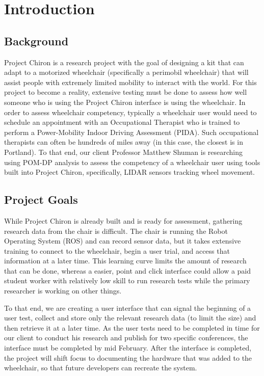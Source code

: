 \documentclass[onecolumn, draftclsnofoot,10pt, compsoc]{IEEEtran}
\begin{document}
\section{Introduction}
\subsection{Background}
Project Chiron is a research project with the goal of designing a kit that can adapt to a motorized wheelchair (specifically a perimobil wheelchair) that will assist people with extremely limited mobility to interact with the world. For this project to become a reality, extensive testing must be done to assess how well someone who is using the Project Chiron interface is using the wheelchair. In order to assess wheelchair competency, typically a wheelchair user would need to schedule an appointment with an Occupational Therapist who is trained to perform a Power-Mobility Indoor Driving
Assessment (PIDA). Such occupational therapists can often be hundreds of miles away (in this case, the closest is in Portland). To that end, our client Professor Matthew Shuman is researching using POM-DP analysis to assess the competency of a wheelchair user using tools built into Project Chiron, specifically, LIDAR sensors tracking wheel movement. 
\subsection{Project Goals}
While Project Chiron is already built and is ready for assessment, gathering research data from the chair is difficult. The chair is running the Robot Operating System (ROS) and can record sensor data, but it takes extensive training to connect to the wheelchair, begin a user trial, and access that information at a later time. This learning curve limits the amount of research that can be done, whereas a easier, point and click interface could allow a paid student worker with relatively low skill to run research tests while the primary researcher is working on other things.

To that end, we are creating a user interface that can signal the beginning of a user test, collect and store only the relevant research data (to limit the size) and then retrieve it at a later time. As the user tests need to be completed in time for our client to conduct his research and publish for two specific conferences, the interface must be completed by mid February. After the interface is completed, the project will shift focus to documenting the hardware that was added to the wheelchair, so that future developers can recreate the system.
\end{document}
